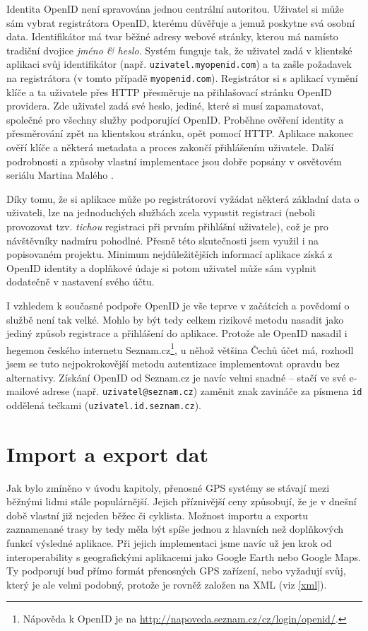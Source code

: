 Identita OpenID není spravována jednou centrální autoritou. Uživatel
si může sám vybrat registrátora OpenID, kterému důvěřuje a jemuž
poskytne svá osobní data. Identifikátor má tvar běžné adresy webové
stránky, kterou má namísto tradiční dvojice {\it jméno \& heslo}.
Systém funguje tak, že uživatel zadá v klientské aplikaci svůj
identifikátor (např. {\tt uzivatel.myopenid.com}) a ta zašle
požadavek na registrátora (v tomto případě {\tt myopenid.com}).
Registrátor si s aplikací vymění klíče a ta uživatele přes HTTP
přesměruje na přihlašovací stránku OpenID providera. Zde uživatel
zadá své heslo, jediné, které si musí zapamatovat, společné pro
všechny služby podporující OpenID. Proběhne ověření identity a
přesměrování zpět na klientskou stránku, opět pomocí HTTP. Aplikace
nakonec ověří klíče a některá metadata a proces zakončí přihlášením
uživatele. Další podrobnosti a způsoby vlastní implementace jsou
dobře popsány v osvětovém seriálu Martina Malého \cite{openid}.

Díky tomu, že si aplikace může po registrátorovi vyžádat některá
základní data o uživateli, lze na jednoduchých službách zcela
vypustit registraci (neboli provozovat tzv. {\it tichou} registraci
při prvním přihlášní uživatele), což je pro návštěvníky nadmíru
pohodlné. Přesně této skutečnosti jsem využil i na popisovaném
projektu. Minimum nej\-důležitějších informací aplikace získá z OpenID
identity a doplňkové údaje si potom uživatel může sám vyplnit
dodatečně v nastavení svého účtu.

I vzhledem k současné podpoře OpenID je vše teprve v začátcích a
povědomí o službě není tak velké. Mohlo by být tedy celkem rizikové
metodu nasadit jako jediný způsob registrace a přihlášení do aplikace.
Protože ale OpenID nasadil i hegemon českého internetu
Seznam.cz\footnote{Nápověda
k OpenID je na \url{http://napoveda.seznam.cz/cz/login/openid/}.}, u
něhož většina Čechů účet má, rozhodl jsem se tuto nej\-pokrokovější metodu autentizace implementovat opravdu bez alternativy. Získání
OpenID od Seznam.cz je navíc velmi snadné -- stačí ve své e-mailové
adrese (např. {\tt uzivatel@seznam.cz}) zaměnit znak zavináče za
písmena {\tt id} oddělená tečkami ({\tt uzivatel.id.seznam.cz}).

\section{Import a export dat}
Jak bylo zmíněno v úvodu kapitoly, přenosné GPS systémy se stávají
mezi běžnými lidmi stále populárnější. Jejich příznivější ceny
způsobují, že je v dnešní době vlastní již nejeden běžec či cyklista.
Možnost importu a exportu zaznamenané trasy by tedy měla být spíše
jednou z hlavních než doplňkových funkcí výsledné aplikace. Při
jejich implementaci jsme navíc už jen krok od interoperability s
geografickými aplikacemi jako Google Earth nebo Google Maps. Ty
podporují buď přímo formát přenosných GPS zařízení, nebo vyžadují
svůj, který je ale velmi podobný, protože je rovněž založen na XML
(viz \ref{xml}).


